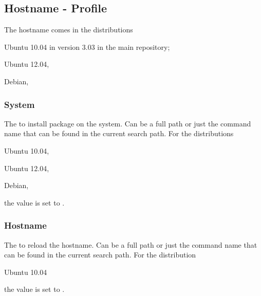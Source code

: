 \subsection{Hostname - Profile}

The hostname comes in the distributions 
\begin{compactitem}
\item[\TheDistribution{ubuntu}] Ubuntu 10.04 in version 3.03 in the main repository;
\item[\TheDistribution{ubuntu}] Ubuntu 12.04,
\item[\TheDistribution{debian}] Debian,
\end{compactitem}

\subsubsection*{System}


The  to install package on the system. Can be a full path or
just the command name that can be found in the current search path. 
For the distributions 
\begin{inparaitem}
\item[\TheDistribution{ubuntu}] Ubuntu 10.04,
\item[\TheDistribution{ubuntu}] Ubuntu 12.04,
\item[\TheDistribution{debian}] Debian,
\end{inparaitem}
the value is set to .

\subsubsection*{Hostname}


The  to reload the hostname. Can be a full path or
just the command name that can be found in the current search path.
For the distribution
\begin{inparaitem}
\item[\TheDistribution{ubuntu}] Ubuntu 10.04
\end{inparaitem}
the value is set to .

